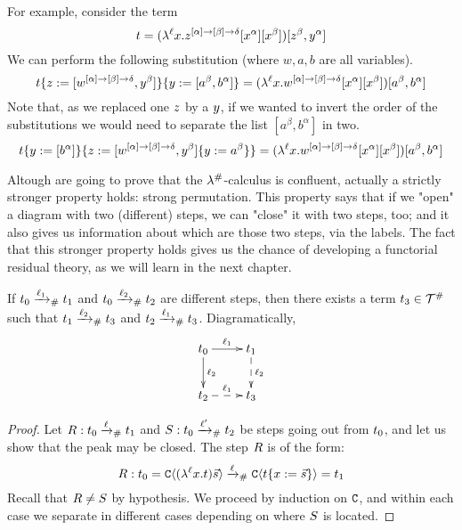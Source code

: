 \begin{example} For example, consider the term
\[
  t =
    (\lambda^{\ell} x. z^{[\alpha] \to [\beta] \to \delta} [x^\alpha] [x^\beta])
      [z^\beta,y^\alpha]
\]
We can perform the following substitution (where $w,a,b$ are all variables).
\[
  \subs{
    \subs{\tm}{\varthree}{[w^{[\alpha] \to [\beta] \to \delta}, \vartwo^\beta]}
  }{
    \vartwo
  }{
    [a^\beta,b^\alpha]
  }
  =
   (\lamp{\lab}{\var}{w^{[\alpha] \to [\beta] \to \delta} [\var^\alpha] [\var^\beta]})
    [a^\beta,b^\alpha]
\]
Note that, as we replaced one $z$ by a $y$, if we wanted to invert the order
of the substitutions we would need to separate the list $[a^\beta, b^\alpha]$ in two.
\[
  \subs{
    \subs{\tm}{\vartwo}{[b^\alpha]}
  }{
    \varthree
  }{
    \subs{[w^{[\alpha] \to [\beta] \to \delta}, \vartwo^\beta]}{\vartwo}{a^\beta}
  }
  =
   (\lamp{\lab}{\var}{w^{[\alpha] \to [\beta] \to \delta} [\var^\alpha] [\var^\beta]})
    [a^\beta,b^\alpha]
\]
\end{example}

\bigskip

Altough are going to prove that the $\lambda^{\mathtt{\#}}$-calculus is confluent,
actually a strictly stronger property holds: strong permutation.
This property says that if we "open" a diagram with two (different) steps,
we can "close" it with two steps, too; and it also gives us information
about which are those two steps, via the labels.
The fact that this stronger property holds gives us the chance of
developing a functorial residual theory, as we will learn in the next chapter.



\begin{proposition}
If $t_0 \mathrel{\xrightarrow{\ell_1}_{\mathtt{\#}}} t_1$
and $t_0 \mathrel{\xrightarrow{\ell_2}_{\mathtt{\#}}} t_2$
are different steps, then there exists a term $t_3 \in \mathcal{T}^{\mathtt{\#}}$ such that
$t_1 \mathrel{\xrightarrow{\ell_2}_{\mathtt{\#}}} t_3$ and $t_2 \mathrel{\xrightarrow{\ell_1}_{\mathtt{\#}}} t_3$.
Diagramatically,
\[
    \xymatrix{
      \tm_0 \ar@{->}[d]^{\lab_2}
            \ar@{->}[r]^{\lab_1} &
      \tm_1 \ar@{-->}[d]^{\lab_2} \\
            \ar@{-->}[r]^{\lab_1}
      \tm_2 &
      \tm_3 \\
    }
\]
\end{proposition}
\begin{proof}
Let $R : t_0 \mathrel{\xrightarrow{\ell}_{\mathtt{\#}}} t_1$ and $S : t_0 \mathrel{\xrightarrow{\ell'}_{\mathtt{\#}}} t_2$
be steps going out from $t_0$, and let us show that the peak may be closed.
The step $R$ is of the form:
\[
  R : t_0 = \mathtt{C}\langle(\lambda^{\ell} x. t)\vec{s}\rangle
           \mathrel{\xrightarrow{\ell}_{\mathtt{\#}}} \mathtt{C}\langle t\{x := \vec{s}\}\rangle = t_1
\]
Recall that $R \neq S$ by hypothesis.
We proceed by induction on $\mathtt{C}$, and within each case we separate in different
cases depending on where $S$ is located.
\end{proof}

